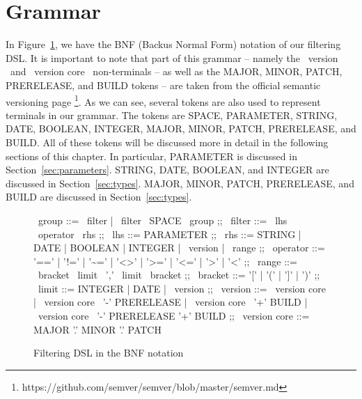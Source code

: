 \section{Grammar}\label{sec:grammar}
In Figure~\ref{fig:bnf}, we have the BNF (Backus Normal Form) notation of our filtering DSL\@.
It is important to note that part of this grammar -- namely the \textlangle~version \textrangle~and \textlangle~version core \textrangle~non-terminals -- as well as the MAJOR, MINOR, PATCH, PRERELEASE, and BUILD tokens -- are taken from the official semantic versioning page \footnote{https://github.com/semver/semver/blob/master/semver.md}.
As we can see, several tokens are also used to represent terminals in our grammar.
The tokens are SPACE, PARAMETER, STRING, DATE, BOOLEAN, INTEGER, MAJOR, MINOR, PATCH, PRERELEASE, and BUILD\@.
All of these tokens will be discussed more in detail in the following sections of this chapter.
In particular, PARAMETER is discussed in Section~\ref{sec:parameters}.
STRING, DATE, BOOLEAN, and INTEGER are discussed in Section~\ref{sec:types}.
MAJOR, MINOR, PATCH, PRERELEASE, and BUILD are discussed in Section~\ref{sec:types}.

\begin{figure}[!h]
    \begin{center}
        \begin{bnf}
            \textlangle~group \textrangle ::= \textlangle~filter \textrangle | \textlangle~filter \textrangle~SPACE \textlangle~group \textrangle
            ;;
            \textlangle~filter \textrangle ::= \textlangle~lhs \textrangle \textlangle~operator \textrangle \textlangle~rhs \textrangle
            ;;
            \textlangle~lhs \textrangle ::= PARAMETER
            ;;
            \textlangle~rhs \textrangle ::= STRING | DATE | BOOLEAN | INTEGER | \textlangle~version \textrangle | \textlangle~range \textrangle
            ;;
            \textlangle~operator \textrangle ::= '==' | '!=' | '\textasciitilde=' | '<>' | '>=' | '<=' | '>' | '<'
            ;;
            \textlangle~range \textrangle ::= \textlangle~bracket \textrangle \textlangle~limit \textrangle~',' \textlangle~limit \textrangle \textlangle~bracket \textrangle
            ;;
            \textlangle~bracket \textrangle ::= '[' | '(' | ']' | ')'
            ;;
            \textlangle~limit \textrangle ::= INTEGER | DATE | \textlangle~version \textrangle
            ;;
            \textlangle~version \textrangle ::= \textlangle~version core \textrangle | \textlangle~version core \textrangle~'-' PRERELEASE | \textlangle~version core \textrangle~'+' BUILD | \textlangle~version core \textrangle~'-' PRERELEASE '+' BUILD
            ;;
            \textlangle~version core \textrangle ::= MAJOR '.' MINOR '.' PATCH
        \end{bnf}
    \end{center}

    \caption{Filtering DSL in the BNF notation}
    \label{fig:bnf}
\end{figure}
